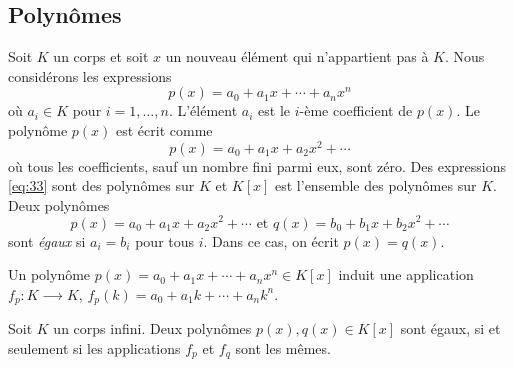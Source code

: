 \subsection{Polynômes}
\label{sec:polynomes}
Soit $K$ un corps et soit $x$ un nouveau élément qui n'appartient pas à $K$. Nous considérons les expressions 
\begin{equation}
  \label{eq:33}
  p(x) = a_0 + a_1 x + \cdots + a_n x^n
\end{equation}
où $a_i ∈K$ pour $i=1,\dots,n$.  L'élément $a_i$ est le $i$-ème coefficient de $p(x)$. Le polynôme $p(x)$ est écrit comme 
\begin{displaymath}
  p(x) = a_0 + a_1x + a_2x^2 + \cdots 
\end{displaymath}
où tous les  coefficients, sauf un nombre fini parmi eux, sont zéro. 
Des expressions \eqref{eq:33} sont des polynômes sur $K$  et $K[x]$ est l'ensemble des polynômes sur $K$. Deux polynômes 
\begin{displaymath}
  p(x) = a_0 + a_1x + a_2x^2 + \cdots \text{ et } q(x) = b_0 + b_1x + b_2x^2 + \cdots
\end{displaymath}
sont \emph{égaux} si $a_i  =b_i$ pour tous $i$. Dans ce cas, on écrit $p(x) = q(x)$. 


Un polynôme $p(x) = a_0 + a_1 x + \cdots + a_n x^n ∈ K[x]$ induit une application $f_p:  K ⟶ K$, $f_p(k) = a_0+ a_1 k+ \cdots + a_n k^n$. 

\begin{theorem}
  \label{thr:42}
  Soit $K$ un corps infini. Deux polynômes $p(x),q(x) ∈ K[x]$ sont égaux, si et seulement si les applications $f_p$ et $f_q$ sont les mêmes. 
\end{theorem}




